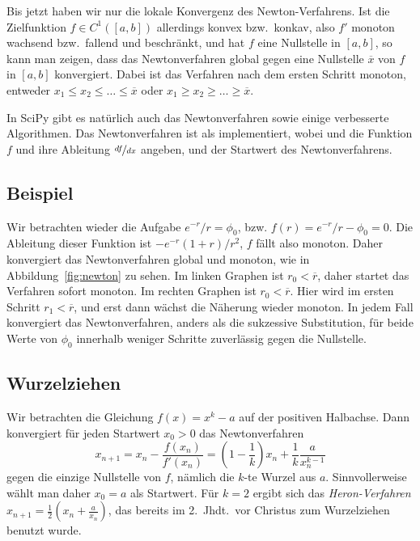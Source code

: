 Bis jetzt haben wir nur die lokale Konvergenz des
Newton-Verfahrens. Ist die Zielfunktion $f\in C^1([a,b])$ allerdings
konvex bzw.\ konkav, also $f'$ monoton wachsend bzw.\ fallend und
beschränkt, und hat $f$ eine Nullstelle in $[a,b]$, so kann man
zeigen, dass das Newtonverfahren global gegen eine Nullstelle
$\overline{x}$ von $f$ in $[a,b]$ konvergiert. Dabei ist das Verfahren
nach dem ersten Schritt monoton, \dh entweder $x_1\le
x_2\le\ldots\le\overline{x}$ oder $x_1\ge
x_2\ge\ldots\ge\overline{x}$.

In SciPy gibt es natürlich auch das Newtonverfahren sowie einige
verbesserte Algorithmen. Das Newtonverfahren ist als
 implementiert, wobei 
und  die Funktion $f$ und ihre Ableitung $\nicefrac{df}{dx}$
angeben, und  der Startwert des Newtonverfahrens.

\subsection{Beispiel}

Wir betrachten wieder die Aufgabe $e^{-r}/r = \phi_0$, bzw. $f(r) =
e^{-r}/r - \phi_0 = 0$. Die Ableitung dieser Funktion ist $-e^{-r}(1 +
r)/r^2$, $f$ fällt also monoton. Daher konvergiert das Newtonverfahren
global und monoton, wie in Abbildung~\ref{fig:newton} zu sehen. Im
linken Graphen ist $r_0<\overline{r}$, daher startet das Verfahren
sofort monoton. Im rechten Graphen ist $r_0 < \overline{r}$. Hier wird
im ersten Schritt $r_1 < \overline{r}$, und erst dann wächst die
Näherung wieder monoton. In jedem Fall konvergiert das
Newtonverfahren, anders als die sukzessive Substitution, für beide
Werte von $\phi_0$ innerhalb weniger Schritte zuverlässig gegen die
Nullstelle.

\subsection{Wurzelziehen}

Wir betrachten die Gleichung $f(x) = x^k - a$ auf der positiven
Halbachse. Dann konvergiert für jeden Startwert $x_0>0$ das
Newtonverfahren
\begin{equation}
  x_{n+1} = x_n - \frac{f(x_n)}{f'(x_n)} = \left(1 -
    \frac{1}{k}\right) x_n + \frac{1}{k} \frac{a}{x_n^{k-1}}
\end{equation}
gegen die einzige Nullstelle von $f$, nämlich die $k$-te Wurzel aus
$a$. Sinnvollerweise wählt man daher $x_0=a$ als Startwert. Für $k=2$
ergibt sich das \emph{Heron-Verfahren} $x_{n+1} = \frac{1}{2}\left(x_n
  + \frac{a}{x_n}\right)$, das bereits im 2.\ Jhdt.\ vor Christus zum
Wurzelziehen benutzt wurde.

